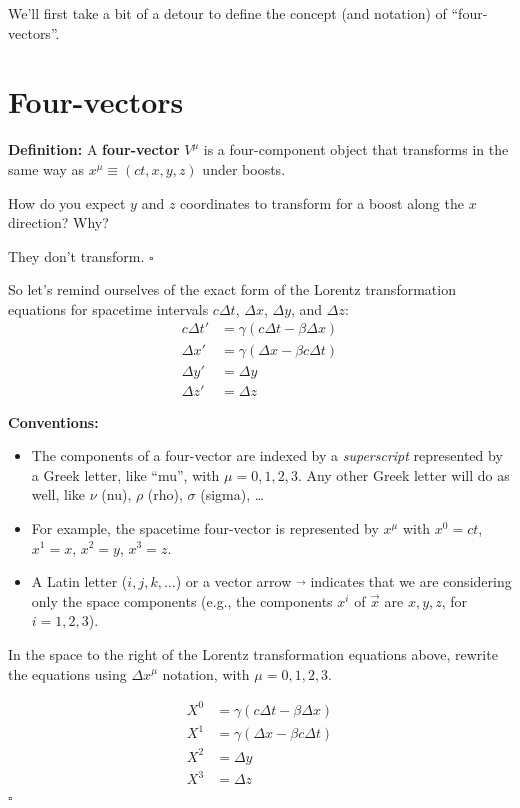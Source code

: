 \documentclass[11pt, letterpaper, openany]{book}
\newenvironment{exercise}[1][Exercise]{%
  \tcolorbox[blanker, breakable, left=1em,
    before skip=1em, after skip=1em,
    borderline west={3pt}{0pt}{PhysNavy},
    colback=PhysCream,
    before upper={\textcolor{PhysNavy}{\sffamily\bfseries #1:}\space}
  ]%
}{%
  \endtcolorbox%
}
\newenvironment{solution}[1][Solution]{%
  \tcolorbox[blanker, breakable, left=1em,
    before skip=1em, after skip=1em,
    borderline west={2pt}{0pt}{PhysTeal},
    colback=PhysCream,
    before upper={\textcolor{PhysTeal}{\sffamily\bfseries #1.}\space}
  ]%
}{%
  \hfill\textcolor{PhysTeal}{\ensuremath{\square}}\endtcolorbox%
}
\begin{document}
We'll first take a bit of a detour to define the concept (and notation) of ``four-vectors''.

\section{Four-vectors}

\textbf{Definition:} A \textbf{four-vector} $V^\mu$ is a four-component object that transforms in the same way as $x^\mu \equiv (ct, x, y, z)$ under boosts.

\begin{exercise}[Quick question]
How do you expect $y$ and $z$ coordinates to transform for a boost along the $x$ direction? Why?
\end{exercise}
\begin{solution}
They don't transform.
\end{solution}

So let's remind ourselves of the exact form of the Lorentz transformation equations for spacetime intervals $c\Delta t$, $\Delta x$, $\Delta y$, and $\Delta z$:
\begin{align*}
    c\Delta t' &= \gamma(c\Delta t - \beta \Delta x) \\
    \Delta x'  &= \gamma(\Delta x - \beta c\Delta t) \\
    \Delta y'  &= \Delta y \\
    \Delta z'  &= \Delta z
\end{align*}

\textbf{Conventions:}
\begin{itemize}
    \item The components of a four-vector are indexed by a \textit{superscript} represented by a Greek letter, like ``mu'', with $\mu = 0, 1, 2, 3$. Any other Greek letter will do as well, like $\nu$ (nu), $\rho$ (rho), $\sigma$ (sigma), \ldots
    \item For example, the spacetime four-vector is represented by $x^\mu$ with $x^0 = ct$, $x^1 = x$, $x^2 = y$, $x^3 = z$.
    \item A Latin letter ($i, j, k, \ldots$) or a vector arrow $\vec{}$ indicates that we are considering only the space components (e.g., the components $x^i$ of $\vec{x}$ are $x, y, z$, for $i = 1, 2, 3$).
\end{itemize}

\begin{exercise}[Exercise 3]
In the space to the right of the Lorentz transformation equations above, rewrite the equations using $\Delta x^\mu$ notation, with $\mu = 0, 1, 2, 3$.
\end{exercise}
\begin{solution}
\begin{align*}
    X^0 &= \gamma(c\Delta t - \beta \Delta x) \\
    X^1 &= \gamma(\Delta x - \beta c\Delta t) \\
    X^2 &= \Delta y \\
    X^3 &= \Delta z
\end{align*}
\end{solution}
\end{document}
